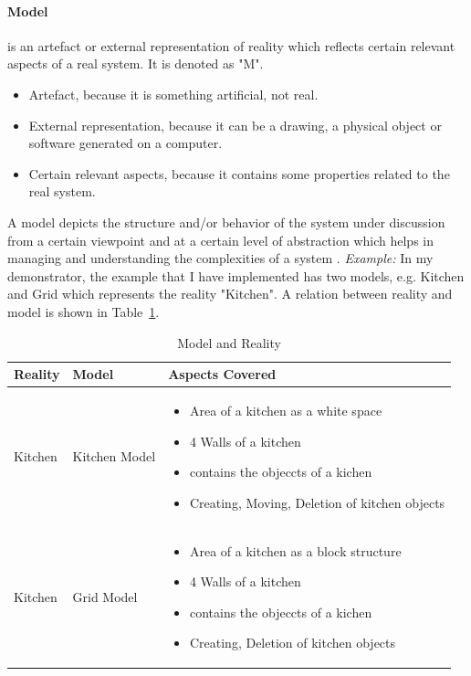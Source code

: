 \paragraph{Model}is an artefact or external representation of reality which reflects certain relevant aspects of a real system. It is denoted as "M".
\begin{itemize}
\item {Artefact, because it is something artificial, not real.}
\item {External representation, because it can be a drawing, a physical object or software generated on a computer.}
\item {Certain relevant aspects, because it contains some properties related to the real system.}
\end{itemize}
A model depicts the structure and/or behavior of the system under discussion from a certain viewpoint and at a certain level of abstraction which helps in managing and understanding the complexities of a system \cite{uml} \cite{mdsd}.
\newline\newline\textit{Example:} In my demonstrator, the example that I have implemented has two models, e.g. Kitchen and Grid which represents the reality "Kitchen". A relation between reality and model is shown in Table~\ref{tab:Model and Reality}.
\begin{table}
	\centering	
	\begin{tabular}{|p{3cm}|p{3cm}|p{9cm}|}
		\hline
		\rowcolor[gray]{.8}	
		\textbf{Reality} & \textbf{Model} & \textbf{Aspects Covered} \\
		\hline
		Kitchen & Kitchen Model & 
		\begin{itemize}
			\item Area of a kitchen as a white space
			\item 4 Walls of a kitchen
			\item contains the objeccts of a kichen
			\item Creating, Moving, Deletion of kitchen objects
		\end{itemize}\\
		\hline
		Kitchen & Grid Model & 
		\begin{itemize}
				\item Area of a kitchen as a block structure
				\item 4 Walls of a kitchen
				\item contains the objeccts of a kichen
				\item Creating, Deletion of kitchen objects
		\end{itemize}\\
		\hline					
		
	\end{tabular}
	\label{tab:Model and Reality}
	\caption{Model and Reality}
\end{table}

